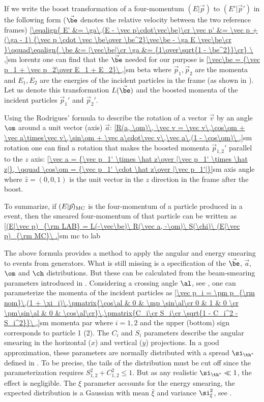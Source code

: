 If we write the boost transformation of a four-momentum $(E|\vec p)$ to $(E'|\vec p')$ in the following form ($\vec\be$ denotes the relative velocity between the two reference frames)
\eqref{\eqalign{
E'      &= \ga\,(E - \vec p\cdot\vec\be)\cr
\vec p' &= \vec p  +  (\ga - 1) {\vec p \cdot \vec \be\over \be^2}\vec\be - \ga E \vec\be\cr
}\qquad\eqalign{
\be &= |\vec\be|\cr
\ga &= {1\over\sqrt{1 - \be^2}}\cr}
\ ,}{sm lorentz}
one can find that the $\vec\be$ needed for our purpose is
\eqref{\vec\be = {\vec p_1 + \vec p_2\over E_1 + E_2}\ ,}{sm beta}
where $\vec p_1, \vec p_2$ are the momenta and $E_1, E_2$ are the energies of the incident particles in the  frame (as shown in ). Let us denote this transformation $L(\vec\be)$ and the boosted momenta of the incident particles $\vec p_1'$ and $\vec p_2'$.

Using the Rodrigues' formula to describe the rotation of a vector $\vec v$ by an angle $\om$ around a unit vector (axis) $\vec a$:
\eqref{R(a, \om)\, \vec v = \vec v\,\cos\om + \vec a\times\vec v\,\sin\om + \vec a\cdot\vec v\,\vec a\,(1 - \cos\om)\ ,}{sm rotation}
one can find a rotation that makes the boosted momenta $\vec p_{1, 2}'$ parallel to the $z$ axis:
\eqref{\vec a = {\vec p_1' \times \hat z\over |\vec p_1' \times \hat z|}, \qquad \cos\om = {\vec p_1' \cdot \hat z\over |\vec p_1'|}}{sm axis angle}
where $\hat z = (0, 0, 1)$ is the unit vector in the $z$ direction in the frame after the boost.

To summarize, if $(E|\vec p)_{\rm MC}$ is the four-momentum of a particle produced in a  event, then the smeared  four-momentum of that particle can be written as
\eqref{(E|\vec p)_{\rm LAB} = L(-\vec\be)\ R(\vec a, -\om)\ S(\chi)\ (E|\vec p)_{\rm MC}\ .}{sm mc to lab}


The above formula provides a method to apply the angular and energy smearing to events from  generators. What is still missing is a specification of the $\vec\be$, $\vec a$, $\om$ and $\ch$ distributions. But these can be calculated from the beam-smearing parameters introduced in . Considering a crossing angle $\al$, see , one can parameterize the momenta of the incident particles as
\eqref{\vec p_i = \pm p_{\rm nom}\,(1 + \xi_i)\,\pmatrix{\cos\al & 0 & \mp \sin\al\cr 0 & 1 & 0 \cr \pm\sin\al & 0 & \cos\al\cr}\,\pmatrix{C_i\cr S_i\cr \sqrt{1 - C_i^2 - S_i^2}}\ ,}{sm momenta par}
where $i = 1, 2$ and the upper (bottom) sign corresponds to particle 1 (2). The $C_i$ and $S_i$ parameters describe the angular smearing in the horizontal ($x$) and vertical ($y$) projections. In a good approximation, these parameters are normally distributed with a spread $\si_{\th^*}$ defined in . To be precise, the tails of the distribution must be cut off since the parameterization requires $S_{1,2}^2 + C_{1,2}^2 \leq 1$. But as any realistic $\si_{\th^*} \ll 1$, the effect is negligible. The $\xi$ parameter accounts for the energy smearing, the expected distribution is a Gaussian with mean $\bar\xi$ and variance $\si_\xi^2$, see .

